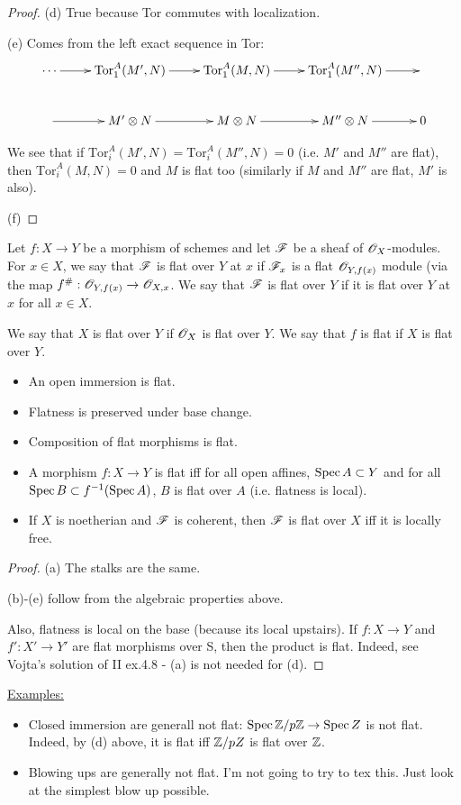 \begin{proof}
(d) True because Tor commutes with localization.

(e) Comes from the left exact sequence in Tor: \[\xymatrix{\cdots
\ar[r] & \text{Tor}_1^A(M',N) \ar[r] & \text{Tor}_1^A(M,N) \ar[r]
&\text{Tor}_1^A(M'',N) \ar[r] & \\
 \ar[r] & M'\otimes N \ar[r] & M\otimes N\ar[r]
&M''\otimes N \ar[r] & 0 } \]

We see that if $\text{Tor}_i^A(M',N) = \text{Tor}_i^A(M'',N)= 0$
(i.e. $M'$ and $M''$ are flat), then $\text{Tor}_i^A(M,N) = 0$ and
$M$ is flat too (similarly if $M$ and $M''$ are flat, $M'$ is
also).

(f) \end{proof}

\begin{definition} Let $f:X\rightarrow Y$ be a morphism of schemes
and let $\mathscr{F}$ be a sheaf of $\mathscr{O}_X$-modules. For $x \in X$, we say
that $\mathscr{F}$ is flat over $Y$ at $x$ if $\mathscr{F}_x$ is a flat
$\mathscr{O}_{Y,f(x)}$ module (via the map $f^{\#}: \mathscr{O}_{Y ,f(x)}
\rightarrow \mathscr{O}_{X,x}$. We say that $\mathscr{F}$ is flat over $Y$ if it is
flat over $Y$ at $x$ for all $x \in X$.

We say that $X$ is flat over $Y$ if $\mathscr{O}_X$ is flat over $Y$. We
say that $f$ is flat if $X$ is flat over $Y$. \end{definition}

\begin{proposition}
 \begin{itemize} \item[(a)] An open immersion
is flat. \item[(b)] Flatness is preserved under base change.
\item[(c)] Composition of flat morphisms is flat. \item[(d)] A
morphism $f:X \rightarrow Y$ is flat iff for all open affines,
$\text{\rm Spec\,}{A} \subset Y$ and for all $\text{\rm Spec\,}{B} \subset
f^{-1}(\text{\rm Spec\,}{A})$, $B$ is flat over $A$ (i.e. flatness is local).
\item[(e)] If $X$ is noetherian and $\mathscr{F}$ is coherent, then $\mathscr{F}$ is
flat over $X$ iff it is locally free. \end{itemize}
\end{proposition} \begin{proof} (a) The stalks are the same.

(b)-(e) follow from the algebraic properties above.

Also, flatness is local on the base (because its local upstairs).
If $f:X\rightarrow Y$ and $f':X'\rightarrow Y'$ are flat morphisms
over S, then the product is flat. Indeed, see Vojta's solution of
II ex.4.8 - (a) is not needed for (d). \end{proof}

\underline{Examples:}\begin{itemize}
 \item  Closed immersion are
generall not flat: $\text{\rm Spec\,}{\mathbb{Z}/p\mathbb{Z}} \rightarrow \text{\rm Spec\,}{Z}$ is not
flat. Indeed, by (d) above, it is flat iff $\mathbb{Z}/pZ$ is flat over
$\mathbb{Z}$.
 \item Blowing ups are generally not flat. I'm not going to try to tex
this. Just look at the simplest blow up possible. \end{itemize}
